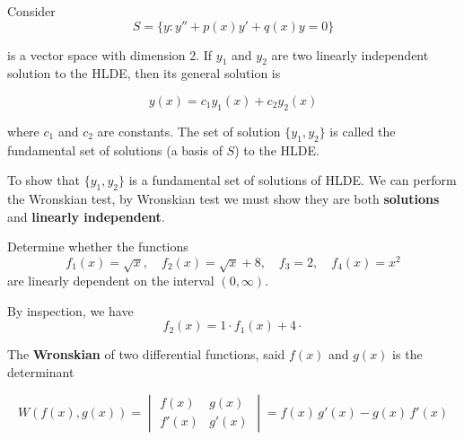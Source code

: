 Consider 
\begin{equation}
    S = \{ y : y'' + p(x)y' + q(x)y = 0 \}
\end{equation}

is a vector space with dimension 2. If $y_1$ and $y_2$ are two linearly 
independent solution to the HLDE, then its general solution is 

\begin{equation}
    y(x) = c_1 y_1(x) + c_2 y_2(x)
\end{equation}

where $c_1$ and $c_2$ are constants. The set of solution $\{y_1, y_2 \}$ is 
called the fundamental set of  solutions (a basis of $S$) to the HLDE.

To show that $\{y_1, y_2 \}$ is a fundamental set of solutions of HLDE. We can perform the Wronskian test, 
by Wronskian test we must show they are both \textbf{solutions} and \textbf{linearly independent}.

\begin{example}
    Determine whether the functions 
    \[
        f_1(x) = \sqrt{x}, \quad f_2(x) = \sqrt{x} + 8, \quad f_3 = 2, \quad f_4(x) = x^2 
    \]
    are linearly dependent on the interval $(0, \infty)$.

\end{example}
\begin{solution}
    By inspection, we have 
    \[
        f_2(x) = 1 \cdot f_1(x) + 4 \cdot 
    \]
\end{solution}

\begin{definition}[Wronskian]
    The \textbf{Wronskian} of two differential functions, said $f(x)$ and $g(x)$ 
    is the determinant

    \begin{equation}
        W(f(x), g(x)) = \begin{vmatrix}
            f(x) & g(x)\\ f'(x) & g'(x) 
        \end{vmatrix} = f(x)\,g'(x) - g(x)\, f'(x)
    \end{equation}
\end{definition}

